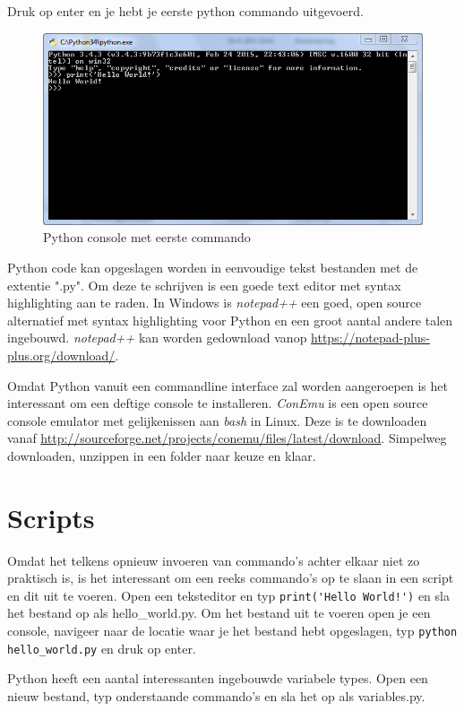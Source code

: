 \documentclass[11pt,twoside]{article}
\begin{document}
Druk op enter en je hebt je eerste python commando uitgevoerd.
\begin{figure}[ht]
	\centering
	\includegraphics[scale=0.5]{fig/Python34}
	\caption{Python console met eerste commando}
	\label{fig:Python34}
\end{figure}

Python code kan opgeslagen worden in eenvoudige tekst bestanden met de extentie "\textsf{.py}". Om deze te schrijven is een goede text editor met syntax highlighting aan te raden. In Windows is \emph{notepad++} een goed, open source alternatief met syntax highlighting voor Python en een groot aantal andere talen ingebouwd. \emph{notepad++} kan worden gedownload vanop \url{https://notepad-plus-plus.org/download/}.

Omdat Python vanuit een commandline interface zal worden aangeroepen is het interessant om een deftige console te installeren. \emph{ConEmu} is een open source console emulator met gelijkenissen aan \emph{bash} in Linux. Deze is te downloaden vanaf \url{http://sourceforge.net/projects/conemu/files/latest/download}. Simpelweg downloaden, unzippen in een folder naar keuze en klaar.

 	\section{Scripts}
Omdat het telkens opnieuw invoeren van commando's achter elkaar niet zo praktisch is, is het interessant om een reeks commando's op te slaan in een script en dit uit te voeren. Open een teksteditor en typ \lstinline{print('Hello World!')} en sla het bestand op als \textsf{hello\_world.py}. Om het bestand uit te voeren open je een console, navigeer naar de locatie waar je het bestand hebt opgeslagen, typ \lstinline[language=bash]{python hello_world.py} en druk op enter.

Python heeft een aantal interessanten ingebouwde variabele types. Open een nieuw bestand, typ onderstaande commando's en sla het op als \textsf{variables.py}.

\end{document}
